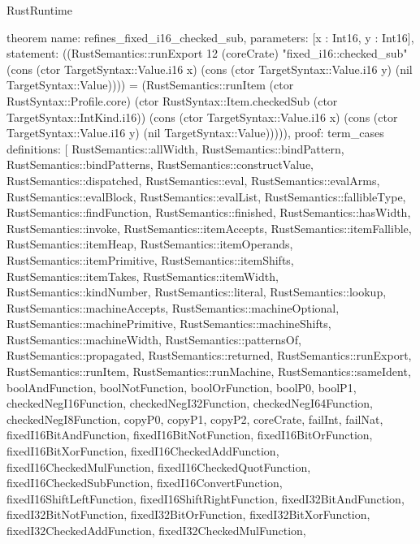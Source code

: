 \begin{lexlean}{RustRuntime}
\begin{semanticmodule}
theorem{
  name: refines_fixed_i16_checked_sub,
  parameters: [x : Int16, y : Int16],
  statement: ((RustSemantics::runExport 12 (coreCrate) "fixed_i16::checked_sub" (cons (ctor TargetSyntax::Value.i16 x) (cons (ctor TargetSyntax::Value.i16 y) (nil TargetSyntax::Value)))) = (RustSemantics::runItem (ctor RustSyntax::Profile.core) (ctor RustSyntax::Item.checkedSub (ctor TargetSyntax::IntKind.i16)) (cons (ctor TargetSyntax::Value.i16 x) (cons (ctor TargetSyntax::Value.i16 y) (nil TargetSyntax::Value))))),
  proof: term_cases{
    definitions: [
      RustSemantics::allWidth,
      RustSemantics::bindPattern,
      RustSemantics::bindPatterns,
      RustSemantics::constructValue,
      RustSemantics::dispatched,
      RustSemantics::eval,
      RustSemantics::evalArms,
      RustSemantics::evalBlock,
      RustSemantics::evalList,
      RustSemantics::fallibleType,
      RustSemantics::findFunction,
      RustSemantics::finished,
      RustSemantics::hasWidth,
      RustSemantics::invoke,
      RustSemantics::itemAccepts,
      RustSemantics::itemFallible,
      RustSemantics::itemHeap,
      RustSemantics::itemOperands,
      RustSemantics::itemPrimitive,
      RustSemantics::itemShifts,
      RustSemantics::itemTakes,
      RustSemantics::itemWidth,
      RustSemantics::kindNumber,
      RustSemantics::literal,
      RustSemantics::lookup,
      RustSemantics::machineAccepts,
      RustSemantics::machineOptional,
      RustSemantics::machinePrimitive,
      RustSemantics::machineShifts,
      RustSemantics::machineWidth,
      RustSemantics::patternsOf,
      RustSemantics::propagated,
      RustSemantics::returned,
      RustSemantics::runExport,
      RustSemantics::runItem,
      RustSemantics::runMachine,
      RustSemantics::sameIdent,
      boolAndFunction,
      boolNotFunction,
      boolOrFunction,
      boolP0,
      boolP1,
      checkedNegI16Function,
      checkedNegI32Function,
      checkedNegI64Function,
      checkedNegI8Function,
      copyP0,
      copyP1,
      copyP2,
      coreCrate,
      failInt,
      failNat,
      fixedI16BitAndFunction,
      fixedI16BitNotFunction,
      fixedI16BitOrFunction,
      fixedI16BitXorFunction,
      fixedI16CheckedAddFunction,
      fixedI16CheckedMulFunction,
      fixedI16CheckedQuotFunction,
      fixedI16CheckedSubFunction,
      fixedI16ConvertFunction,
      fixedI16ShiftLeftFunction,
      fixedI16ShiftRightFunction,
      fixedI32BitAndFunction,
      fixedI32BitNotFunction,
      fixedI32BitOrFunction,
      fixedI32BitXorFunction,
      fixedI32CheckedAddFunction,
      fixedI32CheckedMulFunction,
}}
\end{semanticmodule}
\end{lexlean}
